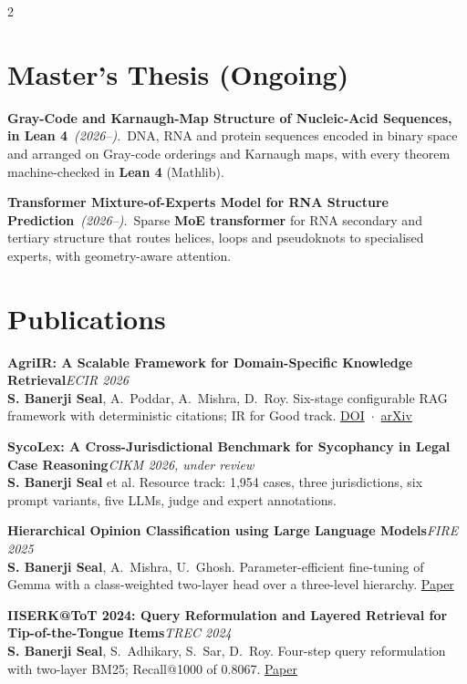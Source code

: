 \documentclass[a4paper,10.5pt]{extarticle}
\newcommand{\entry}[3]{%
  {\normalsize\textbf{#1}}\hfill{\small\itshape\textcolor{mutedtext}{#2}}\\[0.04em]
  {\small #3}\par\vspace{3pt}%
}
\newcommand{\proj}[3]{{\small\textbf{#1}~{\itshape\textcolor{mutedtext}{(#2)}}.\ #3}\par\vspace{2.8pt}}
\begin{document}
\begin{paracol}{2}

\section{Master's Thesis (Ongoing)}

\proj{Gray-Code and Karnaugh-Map Structure of Nucleic-Acid Sequences, in Lean 4}{2026--}{DNA, RNA and protein sequences encoded in binary space and arranged on Gray-code orderings and Karnaugh maps, with every theorem machine-checked in \textbf{Lean 4} (Mathlib).}

\proj{Transformer Mixture-of-Experts Model for RNA Structure Prediction}{2026--}{Sparse \textbf{MoE transformer} for RNA secondary and tertiary structure that routes helices, loops and pseudoknots to specialised experts, with geometry-aware attention.}

\section{Publications}

\entry{AgriIR: A Scalable Framework for Domain-Specific Knowledge Retrieval}{ECIR 2026}{%
\textbf{S. Banerji Seal}, A.~Poddar, A.~Mishra, D.~Roy. Six-stage configurable RAG framework with deterministic citations; IR for Good track. \href{https://doi.org/10.1007/978-3-032-21324-2_37}{DOI}~$\cdot$~\href{https://arxiv.org/abs/2604.16353}{arXiv}}

\entry{SycoLex: A Cross-Jurisdictional Benchmark for Sycophancy in Legal Case Reasoning}{CIKM 2026, under review}{%
\textbf{S. Banerji Seal} et al. Resource track: 1,954 cases, three jurisdictions, six prompt variants, five LLMs, judge and expert annotations.}

\entry{Hierarchical Opinion Classification using Large Language Models}{FIRE 2025}{%
\textbf{S. Banerji Seal}, A.~Mishra, U.~Ghosh. Parameter-efficient fine-tuning of Gemma with a class-weighted two-layer head over a three-level hierarchy. \href{https://ceur-ws.org/Vol-4173/T10-3.pdf}{Paper}}

\entry{IISERK@ToT 2024: Query Reformulation and Layered Retrieval for Tip-of-the-Tongue Items}{TREC 2024}{%
\textbf{S. Banerji Seal}, S.~Adhikary, S.~Sar, D.~Roy. Four-step query reformulation with two-layer BM25; Recall@1000 of 0.8067. \href{https://trec.nist.gov/pubs/trec33/papers/IISER-K.tot.pdf}{Paper}}


\end{paracol}
\end{document}
